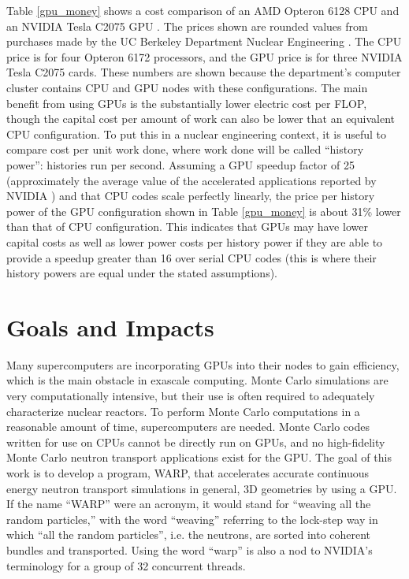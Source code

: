 Table \ref{gpu_money} shows a cost comparison of an AMD Opteron 6128 CPU and an NVIDIA Tesla C2075 GPU \cite{cpu_latency,cuda}.  The prices shown are rounded values from purchases made by the UC Berkeley Department Nuclear Engineering \cite{cost_sheets1,cost_sheets2}.  The CPU price is for four Opteron 6172 processors, and the GPU price is for three NVIDIA Tesla C2075 cards.  These numbers are shown because the department's computer cluster contains CPU and GPU nodes with these configurations.  The main benefit from using GPUs is the substantially lower electric cost per FLOP, though the capital cost per amount of work can also be lower that an equivalent CPU configuration.  To put this in a nuclear engineering context, it is useful to compare cost per unit work done, where work done will be called ``history power'': histories run per second.  Assuming a GPU speedup factor of 25 (approximately the average value of the accelerated applications reported by NVIDIA \cite{nvidia_speedups}) and that CPU codes scale perfectly linearly, the price per history power of the GPU configuration shown in Table \ref{gpu_money} is about 31\% lower than that of CPU configuration.  This indicates that GPUs may have lower capital costs as well as lower power costs per history power if they are able to provide a speedup greater than 16 over serial CPU codes (this is where their history powers are equal under the stated assumptions). 

\section{Goals and Impacts}

Many supercomputers are incorporating GPUs into their nodes to gain efficiency, which is the main obstacle in exascale computing.  Monte Carlo simulations are very computationally intensive, but their use is often required to adequately characterize nuclear reactors.  To perform Monte Carlo computations in a reasonable amount of time, supercomputers are needed.  Monte Carlo codes written for use on CPUs cannot be directly run on GPUs, and no high-fidelity Monte Carlo neutron transport applications exist for the GPU.   The goal of this work is to develop a program, WARP, that accelerates accurate continuous energy neutron transport simulations in general, 3D geometries by using a GPU.  If the name ``WARP'' were an acronym, it would stand for ``weaving all the random particles,'' with the word ``weaving'' referring to the lock-step way in which ``all the random particles'', i.e. the neutrons, are sorted into coherent bundles and transported.  Using the word ``warp'' is also a nod to NVIDIA's terminology for a group of 32 concurrent threads.  

